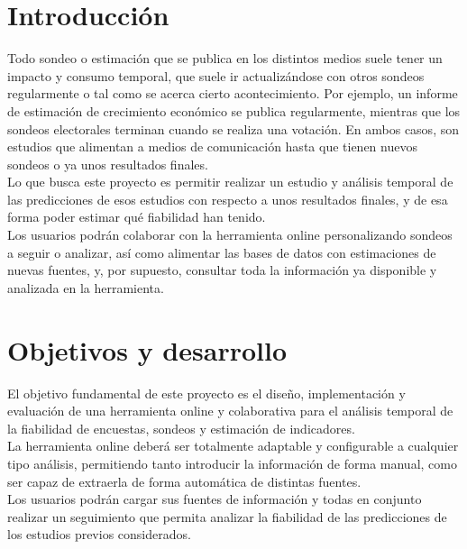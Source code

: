 
\section{Introducción}
\label{sec:introduccion}

Todo sondeo o estimación que se publica en los distintos medios suele tener un impacto y consumo temporal, que suele ir actualizándose con otros sondeos regularmente o tal como se acerca cierto acontecimiento. Por ejemplo, un informe de estimación de crecimiento económico se publica regularmente, mientras que los sondeos electorales terminan cuando se realiza una votación. En ambos casos, son estudios que alimentan a medios de comunicación hasta que tienen nuevos sondeos o ya unos resultados finales.\\
Lo que busca este proyecto es permitir realizar un estudio y análisis temporal de las predicciones de esos estudios con respecto a unos resultados finales, y de esa forma poder estimar qué fiabilidad han tenido.\\
Los usuarios podrán colaborar con la herramienta online personalizando sondeos a seguir o analizar, así como alimentar las bases de datos con estimaciones de nuevas fuentes, y, por supuesto, consultar toda la información ya disponible y analizada en la herramienta.



\section{Objetivos y desarrollo}
\label{sec:objetivos-y-campo}

El objetivo fundamental de este proyecto es el diseño, implementación y evaluación de una herramienta online y colaborativa para el análisis temporal de la fiabilidad de encuestas, sondeos y estimación de indicadores.\\
La herramienta online deberá ser totalmente adaptable y configurable a cualquier tipo análisis, permitiendo tanto introducir la información de forma manual, como ser capaz de extraerla de forma automática de distintas fuentes.\\
Los usuarios podrán cargar sus fuentes de información y todas en conjunto realizar un seguimiento que permita analizar la fiabilidad de las predicciones de los estudios previos considerados.

